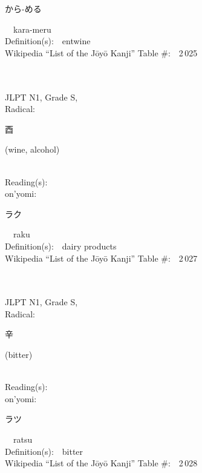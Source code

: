 \begin{multicols}{2}
{\hspace*{2em}}{\begin{CJK}{UTF8}{min} から-める \end{CJK}}\ \ kara-meru\ \ \\
Definition(s):\ \ entwine \\
Wikipedia ``List of the J\=oy\=o Kanji'' Table \#:\ \ 2\,025 \\
\ \ \\
{\fontsize{34pt}{40pt}  }\ \ \\
{JLPT N1, Grade S, \\Radical:\ \ {\begin{CJK}{UTF8}{min} 酉 \end{CJK}} (wine, alcohol) } \\
Reading(s):\ \ \\
{\hspace*{1em}}on'yomi:\ \ \\
{\hspace*{2em}}{\begin{CJK}{UTF8}{min} ラク \end{CJK}}\ \ raku\ \ \\
Definition(s):\ \ dairy products \\
Wikipedia ``List of the J\=oy\=o Kanji'' Table \#:\ \ 2\,027 \\
\ \ \\
{\fontsize{34pt}{40pt}  }\ \ \\
{JLPT N1, Grade S, \\Radical:\ \ {\begin{CJK}{UTF8}{min} 辛 \end{CJK}} (bitter) } \\
Reading(s):\ \ \\
{\hspace*{1em}}on'yomi:\ \ \\
{\hspace*{2em}}{\begin{CJK}{UTF8}{min} ラツ \end{CJK}}\ \ ratsu\ \ \\
Definition(s):\ \ bitter \\
Wikipedia ``List of the J\=oy\=o Kanji'' Table \#:\ \ 2\,028 \\
\ \ \\
{\fontsize{34pt}{40pt}  }\ \ \\

\end{multicols}
